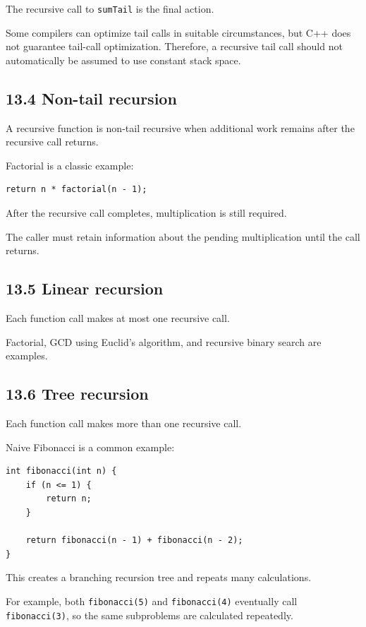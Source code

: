 The recursive call to \texttt{sumTail} is the final action.

Some compilers can optimize tail calls in suitable circumstances, but C++ does not guarantee tail-call optimization. Therefore, a recursive tail call should not automatically be assumed to use constant stack space.

\subsection{13.4 Non-tail recursion}

A recursive function is non-tail recursive when additional work remains after the recursive call returns.

Factorial is a classic example:

\begin{lstlisting}[style=cppstyle]
return n * factorial(n - 1);
\end{lstlisting}

After the recursive call completes, multiplication is still required.

The caller must retain information about the pending multiplication until the call returns.

\subsection{13.5 Linear recursion}

Each function call makes at most one recursive call.

Factorial, GCD using Euclid's algorithm, and recursive binary search are examples.

\subsection{13.6 Tree recursion}

Each function call makes more than one recursive call.

Naive Fibonacci is a common example:

\begin{lstlisting}[style=cppstyle]
int fibonacci(int n) {
    if (n <= 1) {
        return n;
    }

    return fibonacci(n - 1) + fibonacci(n - 2);
}
\end{lstlisting}

This creates a branching recursion tree and repeats many calculations.

For example, both \texttt{fibonacci(5)} and \texttt{fibonacci(4)} eventually call \texttt{fibonacci(3)}, so the same subproblems are calculated repeatedly.

